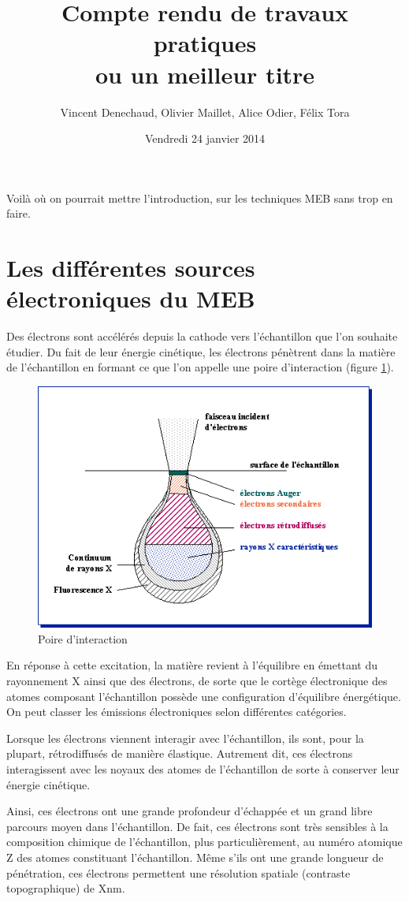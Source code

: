 \documentclass[a4paper,12pt]{article}
\title{Compte rendu de travaux pratiques\\ \small ou un meilleur titre}
\author{Vincent Denechaud, Olivier Maillet, Alice Odier, Félix Tora}
\date{Vendredi 24 janvier 2014}
\begin{document}
\maketitle

Voilà où on pourrait mettre l'introduction, sur les techniques MEB sans trop en faire.


\section{Les différentes sources électroniques du MEB}

Des électrons sont accélérés depuis la cathode vers l'échantillon que l'on souhaite étudier. Du fait de leur énergie cinétique, les électrons pénètrent dans la matière de l'échantillon en formant ce que l'on appelle une poire d'interaction (figure \ref{fig:poire_int}).

\begin{figure}
\centering
\includegraphics[width = 0.7 \textwidth]{images/poire_int.png}
\caption{Poire d'interaction}
\label{fig:poire_int}
\end{figure}


En réponse à cette excitation, la matière revient à l'équilibre en émettant du rayonnement X ainsi que des électrons, de sorte que le cortège électronique des atomes composant l'échantillon possède une configuration d'équilibre énergétique. 
On peut classer les émissions électroniques selon différentes catégories.


Lorsque les électrons viennent interagir avec l'échantillon, ils sont, pour la plupart, rétrodiffusés de manière élastique. Autrement dit, ces électrons interagissent avec les noyaux des atomes de l'échantillon de sorte à conserver leur énergie cinétique.

Ainsi, ces électrons ont une grande profondeur d'échappée et un grand libre parcours moyen dans l'échantillon.
De fait, ces électrons sont très sensibles à la composition chimique de l'échantillon, plus particulièrement, au numéro atomique Z des atomes constituant l'échantillon.
Même s'ils ont une grande longueur de pénétration, ces électrons permettent une résolution spatiale (contraste topographique) de Xnm.
\\
\end{document}
